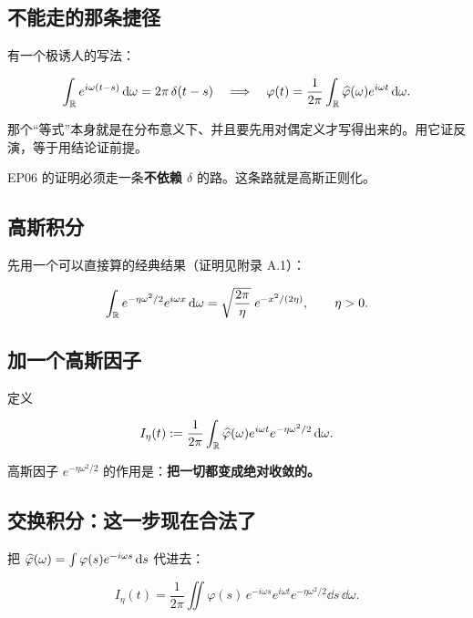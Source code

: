 \subsection{不能走的那条捷径}

有一个极诱人的写法：

\begin{equation}
\int_{\mathbb{R}}e^{i\omega(t-s)}\mathop{}\!\mathrm{d}\omega=2\pi\,\delta(t-s)
\quad\Longrightarrow\quad
\varphi(t)=\frac{1}{2\pi}\int_{\mathbb{R}}\widehat{\varphi}(\omega)e^{i\omega t}\mathop{}\!\mathrm{d}\omega .
\end{equation}

\begin{warnbox}[这是循环论证]
那个“等式”本身就是在分布意义下、并且要先用对偶定义才写得出来的。用它证反演，等于用结论证前提。

EP06 的证明必须走一条\textbf{不依赖 $\delta$} 的路。这条路就是高斯正则化。
\end{warnbox}

\subsection{高斯积分}

先用一个可以直接算的经典结果（证明见附录 A.1）：

\begin{equation}
\int_{\mathbb{R}}e^{-\eta\omega^{2}/2}e^{i\omega x}\mathop{}\!\mathrm{d}\omega=\sqrt{\frac{2\pi}{\eta}}\;e^{-x^{2}/(2\eta)},
\qquad \eta>0 .\label{eq:gauss-int}
\end{equation}

\subsection{加一个高斯因子}

定义

\begin{equation}
I_\eta(t):=\frac{1}{2\pi}\int_{\mathbb{R}}\widehat{\varphi}(\omega)e^{i\omega t}e^{-\eta\omega^{2}/2}\mathop{}\!\mathrm{d}\omega .
\end{equation}

高斯因子 $e^{-\eta\omega^{2}/2}$ 的作用是：\textbf{把一切都变成绝对收敛的。}

\subsection{交换积分：这一步现在合法了}

把 $\widehat{\varphi}(\omega)=\int\varphi(s)e^{-i\omega s}\mathop{}\!\mathrm{d} s$ 代进去：

\begin{equation}
I_\eta(t)=\frac{1}{2\pi}\iint \varphi(s)\,e^{-i\omega s}e^{i\omega t}e^{-\eta\omega^{2}/2}\dd s\,\dd\omega .
\end{equation}

